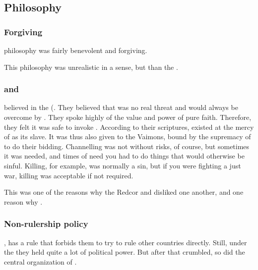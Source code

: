 \subsection{Philosophy}






\subsubsection{Forgiving}
\Telcra philosophy was fairly benevolent and forgiving. 

This philosophy was unrealistic in a sense, but  than the . 






\subsubsection{\Iquin{} and \Itzach}
\ClanTelcra believed in the  (. 
They believed that \itzach was no real threat and would always be overcome by \iquin.
They spoke highly of the value and power of pure faith. 
Therefore, they felt it was safe to invoke \itzach. 
According to their scriptures, \itzach existed at the mercy of \iquin as its slave. 
It was thus also given to the Vaimons, bound by the supremacy of \iquin to do their bidding. 
Channelling \itzach was not without risks, of course, but sometimes it was needed, and times of need you had to do things that would otherwise be sinful. 
Killing, for example, was normally a sin, but if you were fighting a just war, killing was acceptable if not required. 

This was one of the reasons why the Redcor and \Telcras disliked one another, and one reason why .




\subsubsection{Non-rulership policy}
, \ClanTelcra{} has a rule that forbids them to try to rule other countries directly.
Still, under the  they held quite a lot of political power. 
But after that \bacconate{} crumbled, so did the central organization of \ClanTelcra. 

